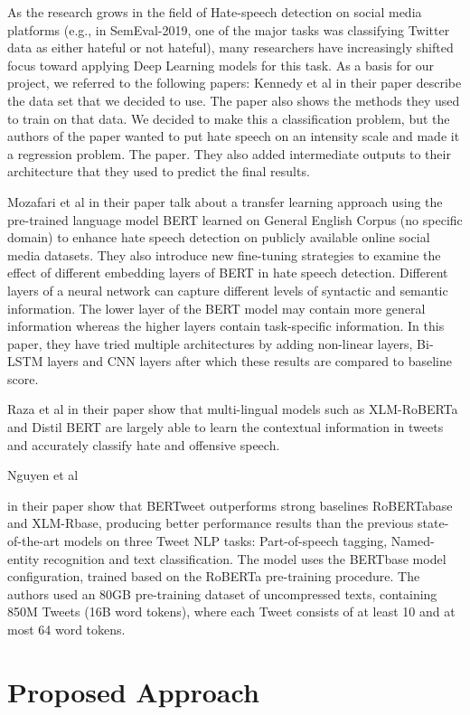 \documentclass[a4paper, 10pt, conference]{IEEEtran}
\begin{document}
{As the research grows in the field of Hate-speech detection on social media platforms (e.g., in SemEval-2019, one of the major tasks was classifying Twitter data as either hateful or not hateful), many researchers have increasingly shifted focus toward applying Deep Learning models for this task. As a basis for our project, we referred to the following papers:
Kennedy et al{\cite{ref1} in their paper describe the data set that we decided to use. The paper also shows the methods they used to train on that data. We decided to make this a classification problem, but the authors of the paper wanted to put hate speech on an intensity scale and made it a regression problem. The paper. They also added intermediate outputs to their architecture that they used to predict the final results.}

{Mozafari et al{\cite{ref2} in their paper talk about a transfer learning approach using the pre-trained language model BERT learned on General English Corpus (no specific domain) to enhance hate speech detection on publicly available online social media datasets. They also introduce new fine-tuning strategies to examine the effect of different embedding layers of BERT in hate speech detection. Different layers of a neural network can capture different levels of syntactic and semantic information. The lower layer of the BERT model may contain more general information whereas the higher layers contain task-specific information. In this paper, they have tried multiple architectures by adding non-linear layers, Bi-LSTM layers and CNN layers after which these results are compared to baseline score.}

{Raza et al{\cite{ref3} in their paper show that multi-lingual models such as XLM-RoBERTa and Distil BERT are largely able to learn the contextual information in tweets and accurately classify hate and offensive speech.}

Nguyen et al{\cite{ref3} in their paper show that BERTweet outperforms strong baselines RoBERTabase and XLM-Rbase, producing better performance results than the previous state-of-the-art models on three Tweet NLP tasks: Part-of-speech tagging, Named-entity recognition and text classification. The model uses the BERTbase model configuration, trained based on the RoBERTa pre-training procedure. The authors used an 80GB pre-training dataset of uncompressed texts, containing 850M Tweets (16B word tokens), where each Tweet consists of at least 10 and at most 64 word tokens.

\section{Proposed Approach}
}}}}
\end{document}
